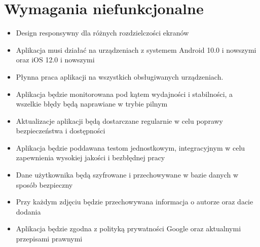 \section{Wymagania niefunkcjonalne}

\begin{itemize}
    \item Design responsywny dla różnych rozdzielczości ekranów
    \item Aplikacja musi działać na urządzeniach z systemem Android 10.0 i nowszymi oraz iOS 12.0 i nowszymi
    \item Płynna praca aplikacji na wszystkich obsługiwanych urządzeniach.
    \item Aplikacja będzie monitorowana pod kątem wydajności i stabilności, a wszelkie błędy będą naprawiane w trybie pilnym
    \item Aktualizacje aplikacji będą dostarczane regularnie w celu poprawy bezpieczeństwa i dostępności
    \item Aplikacja będzie poddawana testom jednostkowym, integracyjnym w celu zapewnienia wysokiej jakości i bezbłędnej pracy
    \item Dane użytkownika będą szyfrowane i przechowywane w bazie danych w sposób bezpieczny
    \item Przy każdym zdjęciu będzie przechowywana informacja o autorze oraz dacie dodania
    \item Aplikacja będzie zgodna z polityką prywatności Google oraz aktualnymi przepisami prawnymi
\end{itemize}












